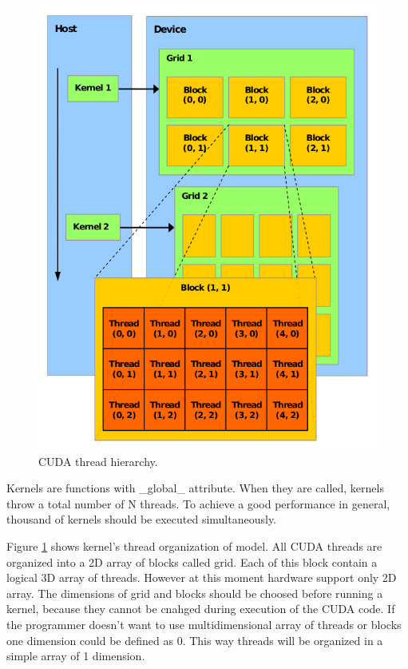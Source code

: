 \documentclass[thesis=M,english]{FITthesis}[2011/07/15]
\begin{document}
\begin{figure}[h]
\centering
\includegraphics[scale=0.4]{images/cuda_threads.png}
\caption{CUDA thread hierarchy\cite{cuda_guide}.}
\label{fig:cuda_threads}
\end{figure}

Kernels are functions with \_global\_ attribute. When they are called, kernels throw a total number of N threads. To achieve a good performance in general, thousand of kernels should be executed simultaneously.

Figure \ref{fig:cuda_threads} shows kernel’s thread organization of model. All CUDA threads are organized into a 2D array of blocks called grid. Each of this block contain a logical 3D array of threads. However at this moment hardware support only 2D array. The dimensions of grid and blocks should be choosed before running a kernel, because they cannot be cnahged during execution of the CUDA code. If the programmer doesn't want to use multidimensional array of threads or blocks one dimension could be defined as 0. This way threads will be organized in a simple array of 1 dimension.
\end{document}
